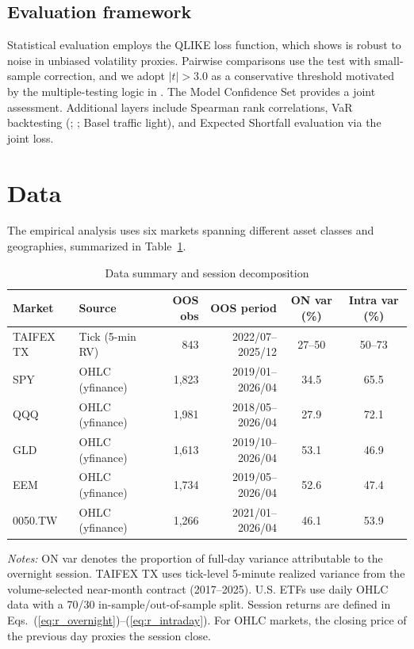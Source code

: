 \documentclass[11pt,a4paper]{article}
\begin{document}
\subsection{Evaluation framework}

Statistical evaluation employs the QLIKE loss function, which \citet{Patton2011} shows is robust to noise in unbiased volatility proxies. Pairwise comparisons use the \citet{Diebold1995} test with \citet{Harvey1997} small-sample correction, and we adopt $|t| > 3.0$ as a conservative threshold motivated by the multiple-testing logic in \citet{Harvey2016}. The Model Confidence Set \citep{Hansen2011MCS} provides a joint assessment. Additional layers include Spearman rank correlations, VaR backtesting (\citealp{Kupiec1995}; \citealp{Christoffersen1998}; Basel traffic light), and Expected Shortfall evaluation via the \citet{Fissler2016} joint loss.


\section{Data}

The empirical analysis uses six markets spanning different asset classes and geographies, summarized in Table~\ref{tab:data}.

\begin{table}[htbp]
\centering
\caption{Data summary and session decomposition}
\label{tab:data}
\small
\begin{tabular}{llrrcc}
\toprule
Market & Source & OOS obs & OOS period & ON var (\%) & Intra var (\%) \\
\midrule
TAIFEX TX  & Tick (5-min RV) & 843  & 2022/07--2025/12 & 27--50 & 50--73 \\
SPY        & OHLC (yfinance) & 1{,}823 & 2019/01--2026/04 & 34.5 & 65.5 \\
QQQ        & OHLC (yfinance) & 1{,}981 & 2018/05--2026/04 & 27.9 & 72.1 \\
GLD        & OHLC (yfinance) & 1{,}613 & 2019/10--2026/04 & 53.1 & 46.9 \\
EEM        & OHLC (yfinance) & 1{,}734 & 2019/05--2026/04 & 52.6 & 47.4 \\
0050.TW    & OHLC (yfinance) & 1{,}266 & 2021/01--2026/04 & 46.1 & 53.9 \\
\bottomrule
\end{tabular}
\begin{flushleft}
\footnotesize
\emph{Notes:} ON var denotes the proportion of full-day variance attributable to the overnight session. TAIFEX TX uses tick-level 5-minute realized variance from the volume-selected near-month contract (2017--2025). U.S. ETFs use daily OHLC data with a 70/30 in-sample/out-of-sample split. Session returns are defined in Eqs.~(\ref{eq:r_overnight})--(\ref{eq:r_intraday}). For OHLC markets, the closing price of the previous day proxies the session close.
\end{flushleft}
\end{table}
\end{document}
